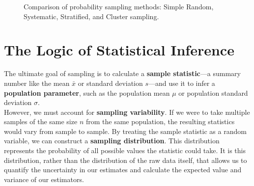 \documentclass[12pt]{scrartcl}
\begin{document}
\begin{figure}[H]
    \caption{Comparison of probability sampling methods: Simple Random, Systematic, Stratified, and Cluster sampling.}
\end{figure}

\newpage
\section{The Logic of Statistical Inference}
The ultimate goal of sampling is to calculate a \textbf{sample statistic}---a summary number like the mean $\bar{x}$ or standard deviation $s$---and use it to infer a \textbf{population parameter}, such as the population mean $\mu$ or population standard deviation $\sigma$. \\

However, we must account for \textbf{sampling variability}. If we were to take multiple samples of the same size $n$ from the same population, the resulting statistics would vary from sample to sample. By treating the sample statistic as a random variable, we can construct a \textbf{sampling distribution}. This distribution represents the probability of all possible values the statistic could take. It is this distribution, rather than the distribution of the raw data itself, that allows us to quantify the uncertainty in our estimates and calculate the expected value and variance of our estimators.
\end{document}
